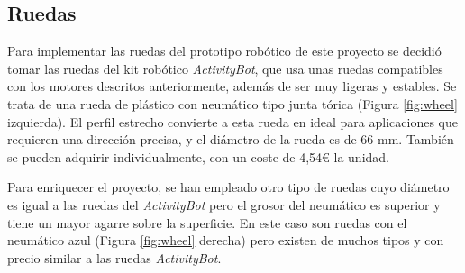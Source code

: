 \setcounter{footnote}{41} %


\subsection{Ruedas}
\label{subsec:ruedas}

Para implementar las ruedas del prototipo robótico de este proyecto se decidió tomar las ruedas del kit robótico \textit{ActivityBot}, que usa unas ruedas compatibles con los motores descritos anteriormente, además de ser muy ligeras y estables. Se trata de una rueda de plástico con neumático tipo junta tórica (Figura \ref{fig:wheel} izquierda). El perfil estrecho convierte a esta rueda en ideal para aplicaciones que requieren una dirección precisa, y el diámetro de la rueda es de 66 mm. También se pueden adquirir individualmente, con un coste de 4,54€ la unidad.

Para enriquecer el proyecto, se han empleado otro tipo de ruedas cuyo diámetro es igual a las ruedas del \textit{ActivityBot} pero el grosor del neumático es superior y tiene un mayor agarre sobre la superficie. En este caso son ruedas con el neumático azul (Figura \ref{fig:wheel} derecha) pero existen de muchos tipos y con precio similar a las ruedas \textit{ActivityBot}.

